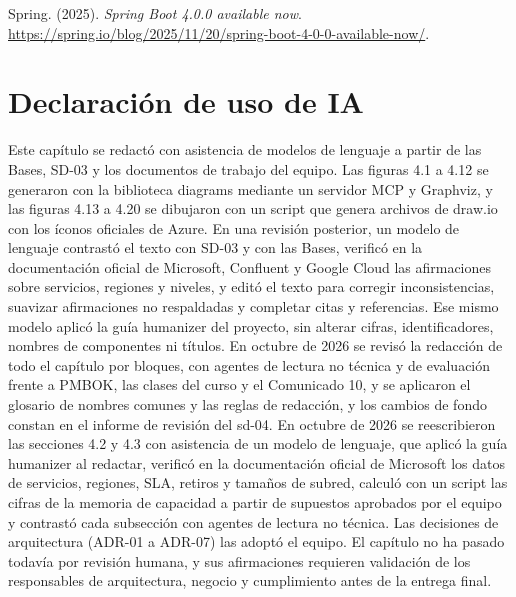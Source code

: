 \documentclass[11pt]{article}
\begin{document}
Spring. (2025). \textit{Spring Boot 4.0.0 available now}. \url{https://spring.io/blog/2025/11/20/spring-boot-4-0-0-available-now/}.

\section*{Declaración de uso de IA}

Este capítulo se redactó con asistencia de modelos de lenguaje a partir de las Bases, SD-03 y los documentos de trabajo del equipo. Las figuras 4.1 a 4.12 se generaron con la biblioteca diagrams mediante un servidor MCP y Graphviz, y las figuras 4.13 a 4.20 se dibujaron con un script que genera archivos de draw.io con los íconos oficiales de Azure. En una revisión posterior, un modelo de lenguaje contrastó el texto con SD-03 y con las Bases, verificó en la documentación oficial de Microsoft, Confluent y Google Cloud las afirmaciones sobre servicios, regiones y niveles, y editó el texto para corregir inconsistencias, suavizar afirmaciones no respaldadas y completar citas y referencias. Ese mismo modelo aplicó la guía humanizer del proyecto, sin alterar cifras, identificadores, nombres de componentes ni títulos. En octubre de 2026 se revisó la redacción de todo el capítulo por bloques, con agentes de lectura no técnica y de evaluación frente a PMBOK, las clases del curso y el Comunicado 10, y se aplicaron el glosario de nombres comunes y las reglas de redacción, y los cambios de fondo constan en el informe de revisión del sd-04. En octubre de 2026 se reescribieron las secciones 4.2 y 4.3 con asistencia de un modelo de lenguaje, que aplicó la guía humanizer al redactar, verificó en la documentación oficial de Microsoft los datos de servicios, regiones, SLA, retiros y tamaños de subred, calculó con un script las cifras de la memoria de capacidad a partir de supuestos aprobados por el equipo y contrastó cada subsección con agentes de lectura no técnica. Las decisiones de arquitectura (ADR-01 a ADR-07) las adoptó el equipo. El capítulo no ha pasado todavía por revisión humana, y sus afirmaciones requieren validación de los responsables de arquitectura, negocio y cumplimiento antes de la entrega final.

\ossFinalPage
\end{document}
